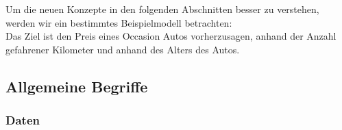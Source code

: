 \documentclass[../main]{subfiles}
\begin{document}
Um die neuen Konzepte in den folgenden Abschnitten besser zu verstehen, werden
wir ein bestimmtes Beispielmodell betrachten:\\
Das Ziel ist den Preis eines Occasion Autos vorherzusagen, anhand der Anzahl
gefahrener Kilometer und anhand des Alters des Autos.

\para{}
\cite{wiki:supervised_learning}
\cite{wiki:unsupervised_learning}

\subsection{Allgemeine Begriffe}

\subsubsection{Daten}
\end{document}
